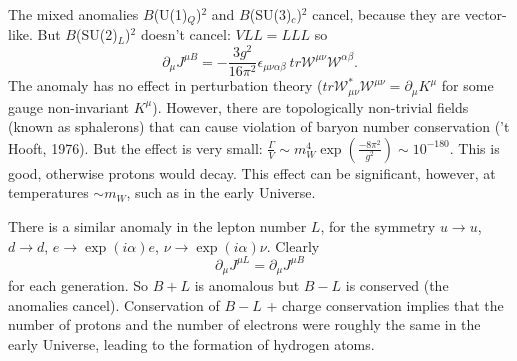 The mixed anomalies $B$(U(1)$_Q$)$^2$ and $B$(SU(3)$_c$)$^2$ cancel, because they are vector-like. But $B$(SU(2)$_L$)$^2$ doesn't cancel: $VLL = LLL$ so
\begin{equation}
\partial_\mu J^{\mu B} = - \frac{3g^2}{16 \pi^2} \epsilon_{\mu \nu \alpha \beta}\ tr \mathcal{W}^{\mu \nu} \mathcal{W}^{\alpha \beta}.
\end{equation}
The anomaly has no effect in perturbation theory ($tr\mathcal{W}_{\mu \nu}^* \mathcal{W}^{\mu \nu}  = \partial_\mu K^\mu$ for some gauge non-invariant $K^\mu$). However, there are topologically non-trivial fields (known as sphalerons) that can cause violation of baryon number conservation ('t Hooft, 1976). But the effect is very small: $\frac{\Gamma}{V} \sim m_W^4 \exp(\frac{-8\pi^2}{g^2}) \sim 10^{-180}$. This is good, otherwise protons would decay. This effect can be significant, however, at temperatures $\sim m_W$, such as in the early Universe.

There is a similar anomaly in the lepton number $L$, for the symmetry  $u \to u$, $d \to d$, $e \to \exp{(i\alpha)}e$, $\nu \to \exp{(i\alpha)}\nu$. Clearly
\begin{equation}
\partial_\mu J^{\mu L} = \partial_\mu J^{\mu B}
\end{equation}
for each generation. So $B + L$ is anomalous but $B-L$ is conserved (the anomalies cancel). Conservation of $B-L$ + charge conservation implies that the number of protons and the number of electrons were roughly the same in the early Universe, leading to the formation of hydrogen atoms.